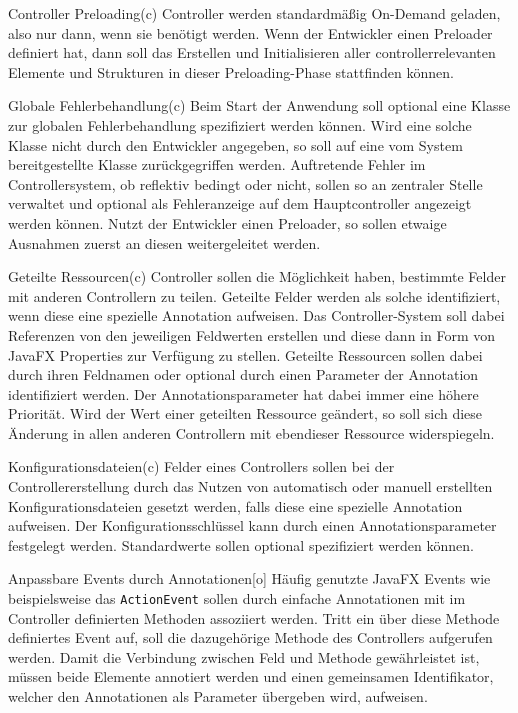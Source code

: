 \begin{freq}{Controller Preloading}(c)
	Controller werden standardmäßig On-Demand geladen, also nur dann, wenn sie benötigt werden. Wenn der Entwickler einen Preloader definiert hat, dann soll das Erstellen und Initialisieren aller controllerrelevanten Elemente und Strukturen in dieser Preloading-Phase stattfinden können.
\end{freq}
\begin{freq}{Globale Fehlerbehandlung}(c)
	Beim Start der Anwendung soll optional eine Klasse zur globalen Fehlerbehandlung spezifiziert werden können. Wird eine solche Klasse nicht durch den Entwickler angegeben, so soll auf eine vom System bereitgestellte Klasse zurückgegriffen werden. Auftretende Fehler im Controllersystem, ob reflektiv bedingt oder nicht, sollen so an zentraler Stelle verwaltet und optional als Fehleranzeige auf dem Hauptcontroller angezeigt werden können. Nutzt der Entwickler einen Preloader, so sollen etwaige Ausnahmen zuerst an diesen weitergeleitet werden.
\end{freq}
\begin{freq}{Geteilte Ressourcen}(c)
	Controller sollen die Möglichkeit haben, bestimmte Felder mit anderen Controllern zu teilen. Geteilte Felder werden als solche identifiziert, wenn diese eine spezielle Annotation aufweisen. Das Controller-System soll dabei Referenzen von den jeweiligen Feldwerten erstellen und diese dann in Form von JavaFX Properties zur Verfügung zu stellen. Geteilte Ressourcen sollen dabei durch ihren Feldnamen oder optional durch einen Parameter der Annotation identifiziert werden. Der Annotationsparameter hat dabei immer eine höhere Priorität. Wird der Wert einer geteilten Ressource geändert, so soll sich diese Änderung in allen anderen Controllern mit ebendieser Ressource widerspiegeln.
\end{freq}
\begin{freq}{Konfigurationsdateien}(c)
	Felder eines Controllers sollen bei der Controllererstellung durch das Nutzen von automatisch oder manuell erstellten Konfigurationsdateien gesetzt werden, falls diese eine spezielle Annotation aufweisen. Der Konfigurationsschlüssel kann durch einen Annotationsparameter festgelegt werden. Standardwerte sollen optional spezifiziert werden können.
\end{freq}
\begin{freq}{Anpassbare Events durch Annotationen}[o]
	Häufig genutzte JavaFX Events wie beispielsweise das \texttt{ActionEvent} sollen durch einfache Annotationen mit im Controller definierten Methoden assoziiert werden. Tritt ein über diese Methode definiertes Event auf, soll die dazugehörige Methode des Controllers aufgerufen werden. Damit die Verbindung zwischen Feld und Methode gewährleistet ist, müssen beide Elemente annotiert werden und einen gemeinsamen Identifikator, welcher den Annotationen als Parameter übergeben wird, aufweisen.
\end{freq}
